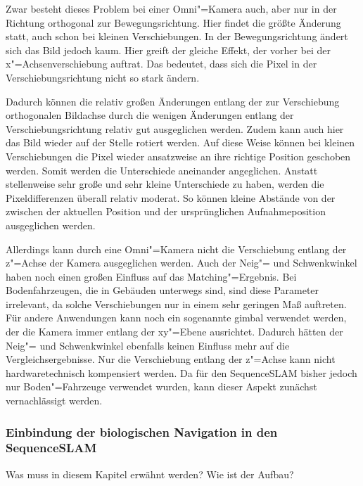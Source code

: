 \documentclass[12pt,a4paper,titlepage]{scrartcl}
\begin{document}
Zwar besteht dieses Problem bei einer Omni"=Kamera auch, aber nur in der Richtung orthogonal zur Bewegungsrichtung. Hier findet die größte Änderung statt, auch schon bei kleinen Verschiebungen. In der Bewegungsrichtung ändert sich das Bild jedoch kaum. Hier greift der gleiche Effekt, der vorher bei der x"=Achsenverschiebung auftrat. Das bedeutet, dass sich die Pixel in der Verschiebungsrichtung nicht so stark ändern. 

Dadurch können die relativ großen Änderungen entlang der zur Verschiebung orthogonalen Bildachse durch die wenigen Änderungen entlang der Verschiebungsrichtung relativ gut ausgeglichen werden. Zudem kann auch hier das Bild wieder auf der Stelle rotiert werden. Auf diese Weise können bei kleinen Verschiebungen die Pixel wieder ansatzweise an ihre richtige Position geschoben werden. Somit werden die Unterschiede aneinander angeglichen. Anstatt stellenweise sehr große und sehr kleine Unterschiede zu haben, werden die Pixeldifferenzen überall relativ moderat. So können kleine Abstände von der zwischen der aktuellen Position und der ursprünglichen Aufnahmeposition ausgeglichen werden.

Allerdings kann durch eine Omni"=Kamera nicht die Verschiebung entlang der z"=Achse der Kamera ausgeglichen werden. Auch der Neig"= und Schwenkwinkel haben noch einen großen Einfluss auf das Matching"=Ergebnis. Bei Bodenfahrzeugen, die in Gebäuden unterwegs sind, sind diese Parameter irrelevant, da solche Verschiebungen nur in einem sehr geringen Maß auftreten. Für andere Anwendungen kann noch ein sogenannte gimbal verwendet werden, der die Kamera immer entlang der xy"=Ebene ausrichtet. Dadurch hätten der Neig"= und Schwenkwinkel ebenfalls keinen Einfluss mehr auf die Vergleichsergebnisse. Nur die Verschiebung entlang der z"=Achse kann nicht hardwaretechnisch kompensiert werden. Da für den SequenceSLAM bisher jedoch nur Boden"=Fahrzeuge verwendet wurden, kann dieser Aspekt zunächst vernachlässigt werden.
\subsubsection{Einbindung der biologischen Navigation in den SequenceSLAM}

Was muss in diesem Kapitel erwähnt werden? Wie ist der Aufbau?
\end{document}
